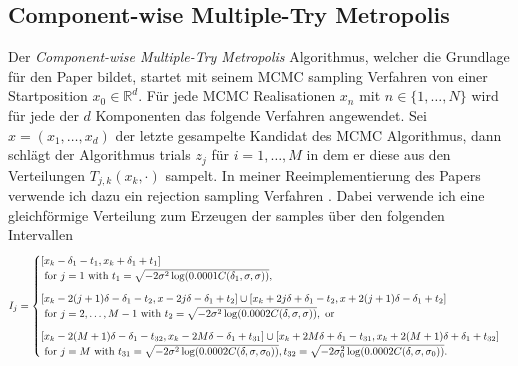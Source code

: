 \documentclass{scrartcl}
\begin{document}
    \subsection{Component-wise Multiple-Try Metropolis} Der \textit{Component-wise Multiple-Try Metropolis} Algorithmus,
    welcher die Grundlage für den Paper \cite{lau2019} bildet, startet mit seinem MCMC sampling Verfahren von einer Startposition
	$x_0\in\mathbb{R}^d$. Für jede MCMC Realisationen $x_n$ mit $n\in\{1,\dots,N\}$ wird für jede der $d$ Komponenten das folgende Verfahren
	angewendet. Sei $x=(x_1,\dots,x_d)$ der letzte gesampelte Kandidat des MCMC Algorithmus, dann schlägt der Algorithmus trials $z_j$
    für $i=1,\dots,M$ in dem er diese aus den Verteilungen $T_{j,k}(x_k,\cdot)$ sampelt. In meiner Reeimplementierung des Papers verwende
    ich dazu ein rejection sampling Verfahren \cite{rejection_sampling}. Dabei verwende ich eine gleichförmige Verteilung zum Erzeugen der samples über den folgenden Intervallen
    \begin{align*}
        I_j = \begin{cases}
                  [x_k-\delta_1-t_1,x_k+\delta_1+t_1]\\\text{ for }j=1\text{ with }t_1 = \sqrt{-2\sigma^2\log(0.0001C(\delta_1,\sigma,\sigma))},\vspace{.25cm}\\
                  [x_k-2(j+1)\delta-\delta_1-t_2,x-2j\delta-\delta_1+t_2]\cup[x_k+2j\delta+\delta_1-t_2,x+2(j+1)\delta-\delta_1+t_2]\\\text{ for }j=2,\dots,M-1\text{ with }t_2=\sqrt{-2\sigma^2\log(0.0002C(\delta,\sigma,\sigma))},\text{ or}\vspace{.25cm}\\
                  [x_k-2(M+1)\delta-\delta_1-t_{32},x_k-2M\delta-\delta_1+t_{31}]\cup[x_k+2M\delta+\delta_1-t_{31},x_k+2(M+1)\delta+\delta_1+t_{32}]\\\text{ for }j=M\text{ with }t_{31}=\sqrt{-2\sigma^2\log(0.0002C(\delta,\sigma,\sigma_0))},t_{32}=\sqrt{-2\sigma_0^2\log(0.0002C(\delta,\sigma,\sigma_0))}.
        \end{cases}
    \end{align*}
\end{document}
